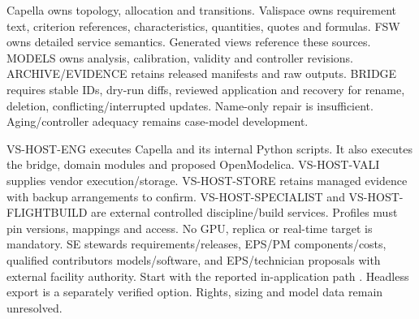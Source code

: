 Capella owns topology, allocation and transitions. Valispace owns requirement text, criterion references, characteristics, quantities, quotes and formulas. FSW owns detailed service semantics. Generated views reference these sources. MODELS owns analysis, calibration, validity and controller revisions. ARCHIVE/EVIDENCE retains released manifests and raw outputs. BRIDGE requires stable IDs, dry-run diffs, reviewed application and recovery for rename, deletion, conflicting/interrupted updates. Name-only repair is insufficient. Aging/controller adequacy remains case-model development.

VS-HOST-ENG executes Capella and its internal Python scripts. It also executes the bridge, domain modules and proposed OpenModelica. VS-HOST-VALI supplies vendor execution/storage. VS-HOST-STORE retains managed evidence with backup arrangements to confirm. VS-HOST-SPECIALIST and VS-HOST-FLIGHTBUILD are external controlled discipline/build services. Profiles must pin versions, mappings and access. No GPU, replica or real-time target is mandatory. SE stewards requirements/releases, EPS/PM components/costs, qualified contributors models/software, and EPS/technician proposals with external facility authority. Start with the reported in-application path \citep[Sec.~3.3]{citation-4690}. Headless export is a separately verified option. Rights, sizing and model data remain unresolved.
